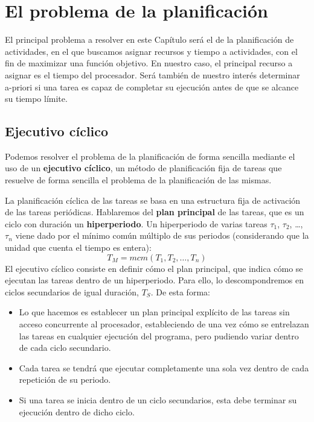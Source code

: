 \section{El problema de la planificación}
El principal problema a resolver en este Capítulo será el de la planificación de actividades, en el que buscamos asignar recursos y tiempo a actividades, con el fin de maximizar una función objetivo. En nuestro caso, el principal recurso a asignar es el tiempo del procesador. Será también de nuestro interés determinar a-priori si una tarea es capaz de completar su ejecución antes de que se alcance su tiempo límite.

\subsection{Ejecutivo cíclico}
Podemos resolver el problema de la planificación de forma sencilla mediante el uso de un \textbf{ejecutivo cíclico}, un método de planificación fija de tareas que resuelve de forma sencilla el problema de la planificación de las mismas.

La planificación cíclica de las tareas se basa en una estructura fija de activación de las tareas periódicas. Hablaremos del \textbf{plan principal} de las tareas, que es un ciclo con duración un \textbf{hiperperiodo}. Un hiperperiodo de varias tareas $\tau_1$, $\tau_2$, \ldots, $\tau_n$ viene dado por el mínimo común múltiplo de sus periodos (considerando que la unidad que cuenta el tiempo es entera):
\begin{equation*}
    T_M = mcm(T_1, T_2, \ldots, T_n)
\end{equation*}
El ejecutivo cíclico consiste en definir cómo el plan principal, que indica cómo se ejecutan las tareas dentro de un hiperperiodo. Para ello, lo descompondremos en ciclos secundarios de igual duración, $T_S$. De esta forma:
\begin{itemize}
    \item Lo que hacemos es establecer un plan principal explícito de las tareas sin acceso concurrente al procesador, estableciendo de una vez cómo se entrelazan las tareas en cualquier ejecución del programa, pero pudiendo variar dentro de cada ciclo secundario.
    \item Cada tarea se tendrá que ejecutar completamente una sola vez dentro de cada repetición de su periodo.
    \item Si una tarea se inicia dentro de un ciclo secundarios, esta debe terminar su ejecución dentro de dicho ciclo.
\end{itemize}
